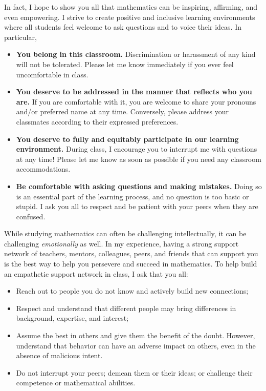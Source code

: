 \documentclass[11pt]{article}
\begin{document}
In fact, I hope to show you all that mathematics can be inspiring, affirming, and even empowering.  I strive to create positive and inclusive learning environments where all students feel welcome to ask questions and to voice their ideas. In particular,
\begin{itemize}[]
    \item \textbf{You belong in this classroom.} Discrimination or harassment of any kind will not be tolerated. Please let me know immediately if you ever feel uncomfortable in class. %
    \item \textbf{You deserve to be addressed in the manner that reflects who you are.} If you are comfortable with it, you are welcome to share your pronouns and/or preferred name at any time. Conversely, please address your classmates according to their expressed preferences.
    \item \textbf{You deserve to fully and equitably participate in our learning environment.} During class, I encourage you to interrupt me with questions at any time! Please let me know as soon as possible if you need any classroom accommodations.
    \item \textbf{Be comfortable with asking questions and making mistakes.} Doing so is an essential part of the learning process, and no question is too basic or stupid.  I ask you all to respect and be patient with your peers when they are confused.
\end{itemize}

While studying mathematics can often be challenging intellectually, it can be challenging \textit{emotionally} as well. In my experience, having a strong support network of teachers, mentors, colleagues, peers, and friends that can support you is the best way to help you persevere and succeed in mathematics. To help build an empathetic support network in class, I ask that you all:
\begin{itemize}[]
    \item Reach out to people you do not know and actively build new connections;
    \item Respect and understand that different people may bring differences in background, expertise, and interest;
    \item Assume the best in others and give them the benefit of the doubt.  However, understand that behavior can have an adverse impact on others, even in the absence of malicious intent.
     \item Do not interrupt your peers; demean them or their ideas; or challenge their competence or mathematical abilities.
\end{itemize}
\end{document}
